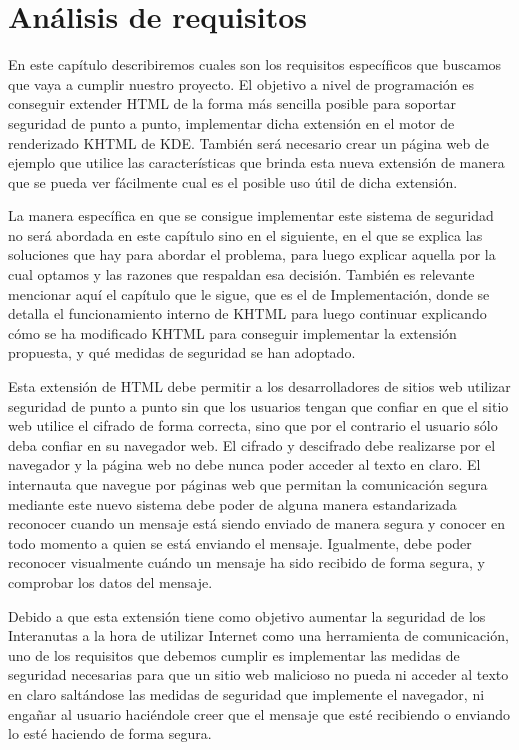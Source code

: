 \chapter{Análisis de requisitos}\label{requisitos}

En este capítulo describiremos cuales son los requisitos específicos que buscamos que vaya a cumplir nuestro proyecto. El objetivo a nivel de programación es conseguir extender HTML de la forma más sencilla posible para soportar seguridad de punto a punto, implementar dicha extensión en el motor de renderizado KHTML de KDE. También será necesario crear un página web de ejemplo que utilice las características que brinda esta nueva extensión de manera que se pueda ver fácilmente cual es el posible uso útil de dicha extensión.

La manera específica en que se consigue implementar este sistema de seguridad no será abordada en este capítulo sino en el siguiente, en el que se explica las soluciones que hay para abordar el problema, para luego explicar aquella por la cual optamos y las razones que respaldan esa decisión. También es relevante mencionar aquí el capítulo que le sigue, que es el de Implementación, donde se detalla el funcionamiento interno de KHTML para luego continuar explicando cómo se ha modificado KHTML para conseguir implementar la extensión propuesta, y qué medidas de seguridad se han adoptado.

Esta extensión de HTML debe permitir a los desarrolladores de sitios web utilizar seguridad de punto a punto sin que los usuarios tengan que confiar en que el sitio web utilice el cifrado de forma correcta, sino que por el contrario el usuario sólo deba confiar en su navegador web. El cifrado y descifrado debe realizarse por el navegador y la página web no debe nunca poder acceder al texto en claro. El internauta que navegue por páginas web que permitan la comunicación segura mediante este nuevo sistema debe poder de alguna manera estandarizada reconocer cuando un mensaje está siendo enviado de manera segura y conocer en todo momento a quien se está enviando el mensaje. Igualmente, debe poder reconocer visualmente cuándo un mensaje ha sido recibido de forma segura, y comprobar los datos del mensaje.

Debido a que esta extensión tiene como objetivo aumentar la seguridad de los Interanutas a la hora de utilizar Internet como una herramienta de comunicación, uno de los requisitos que debemos cumplir es implementar las medidas de seguridad necesarias para que un sitio web malicioso no pueda ni acceder al texto en claro saltándose las medidas de seguridad que implemente el navegador, ni engañar al usuario haciéndole creer que el mensaje que esté recibiendo o enviando lo esté haciendo de forma segura.
